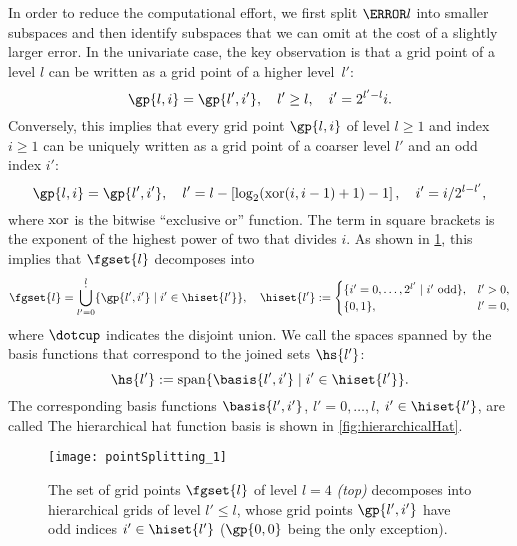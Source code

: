 In order to reduce the computational effort,
we first split $\ns{\*l}$ into smaller subspaces and then identify
subspaces that we can omit at the cost of a slightly larger error.
In the univariate case, the key observation is that a grid point of a level $l$
can be written as a grid point of a higher level~$l'$:
\begin{equation}
  \label{eq:rewriteGridPoint}
  \gp{l,i} = \gp{l',i'},\quad
  l' \ge l,\quad
  i' = 2^{l'-l} i.
\end{equation}
Conversely, this implies that every grid point $\gp{l,i}$ of level $l \ge 1$
and index $i \ge 1$ can be uniquely written
as a grid point of a coarser level $l'$ and an odd index $i'$:
\begin{equation}
  \gp{l,i} = \gp{l',i'},\quad
  l' = l - \left[\log_2(\xor(i, i-1) + 1) - 1\right],\quad
  i' = i/2^{l-l'},
\end{equation}
where $\operatorname{xor}$ is the bitwise ``exclusive or'' function.
The term in square brackets is the exponent of the
highest power of two that divides $i$.
As shown in \cref{fig:pointSplittingUniform},
this implies that $\fgset{l}$ decomposes into
\begin{equation}
  \fgset{l}
  = \bigdotcup_{l'=0}^l \{\gp{l',i'} \mid i' \in \hiset{l'}\},\quad
  \hiset{l'} :=
  \begin{cases}
    \{i' = 0, \dotsc, 2^{l'} \mid \text{$i'$ odd}\},&l' > 0,\\
    \{0, 1\},&l' = 0,
  \end{cases}
\end{equation}
where $\dotcup$ indicates the disjoint union.
We call the spaces spanned by the basis functions that correspond to the
joined sets  $\hs{l'}$:
\begin{equation}
  \hs{l'}
  := \spn\{\basis{l',i'} \mid i' \in \hiset{l'}\}.
\end{equation}
The corresponding basis functions
$\basis{l',i'}$, $l' = 0, \dotsc, l$, $i' \in \hiset{l'}$,
are called 
The hierarchical hat function basis is shown in \cref{fig:hierarchicalHat}.

\begin{SCfigure}
  \texttt{[image: pointSplitting\_1]}%
  \caption[%
    Decomposition of the set of univariate grid points%
  ]{%
    The set of grid points $\fgset{l}$ of level $l = 4$ \emph{(top)}
    decomposes into hierarchical grids of level $l' \le l$,
    whose grid points $\gp{l',i'}$ have odd indices $i' \in \hiset{l'}$
    ($\gp{0,0}$ being the only exception).%
  }%
  \label{fig:pointSplittingUniform}%
\end{SCfigure}

